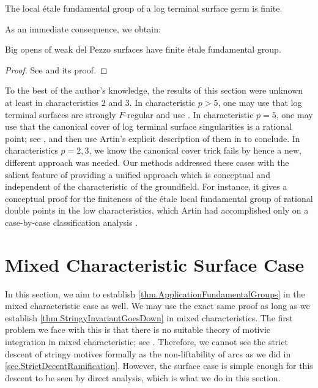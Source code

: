 \documentclass[12pt]{amsart}
\theoremstyle{plain}   %
\theoremstyle{definition}    %
\theoremstyle{remark}    %
\numberwithin{equation}{theorem}
\begin{document}
\begin{theorem} \label{thm.ApplicationFundamentalGroups}
The local \'etale fundamental group of a log terminal surface germ is finite.
\end{theorem}
As an immediate consequence, we obtain:
\begin{corollary}
Big opens of weak del Pezzo surfaces have finite \'etale fundamental group.
\end{corollary}
\begin{proof}
See \cite[Theorem 2.6]{CarvajalRojasStablerKollarFundamentalGroupKLTthreefolds} and its proof.
\end{proof}

\begin{remark}\label{rem.FundamentalGropuSurfaceCase}
To the best of the author's knowledge, the results of this section were unknown at least in characteristics $2$ and $3$. In characteristic $p>5$, one may use that log terminal surfaces are strongly $F$-regular and use \cite{CarvajalSchwedeTuckerEtaleFundFsignature,BhattCarvajalRojasGrafSchwedeTucker}. In characteristic $p=5$, one may use that the canonical cover of log terminal surface singularities is a rational point; see \cite{KawamataIndex1CoversOfLogTerminalSurfaceSingularities,ArimaOnIndexOneCoversOfTwoDimensionalPLTSingsInPosChar}, and then use Artin's explicit description of them in \cite{ArtinCoveringsOfTheRtionalDoublePointsInCharacteristicp} to conclude. In characteristics $p=2,3$, we know the canonical cover trick fails by \cite{KawamataIndex1CoversOfLogTerminalSurfaceSingularities} hence a new, different approach was needed. Our methods addressed these cases with the salient feature of providing a unified approach which is conceptual and independent of the characteristic of the groundfield. For instance, it gives a conceptual proof for the finiteness of the \'etale local fundamental group of rational double points in the low characteristics, which Artin had accomplished only on a case-by-case classification analysis \cite{ArtinCoveringsOfTheRtionalDoublePointsInCharacteristicp}. 
\end{remark}

\section{Mixed Characteristic Surface Case} \label{sec.Mixed_characteristic_surface case}

In this section, we aim to establish \autoref{thm.ApplicationFundamentalGroups} in the mixed characteristic case as well. We may use the exact same proof as long as we establish \autoref{thm.StringyInvariantGoesDown} in mixed characteristics. The first problem we face with this is that there is no suitable theory of motivic integration in mixed characteristic; see \cite[Problem 10.1]{YasudaOpenProblems}. Therefore, we cannot see the strict descent of stringy motives formally as the non-liftability of arcs as we did in \autoref{sec.StrictDecentRamification}. However, the surface case is simple enough for this descent to be seen by direct analysis, which is what we do in this section.
\end{document}
